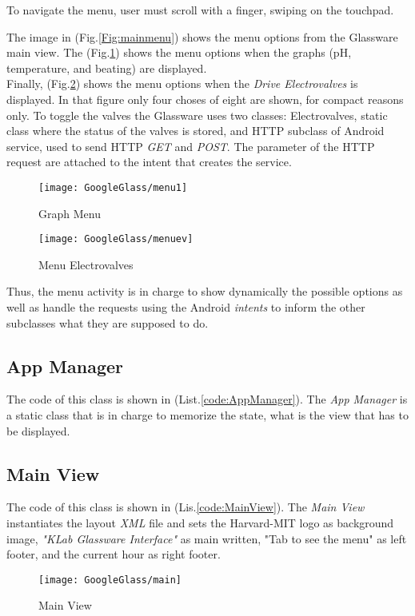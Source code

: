 To navigate the menu, user must scroll with a finger, swiping on the touchpad.

The image in (Fig.\ref{Fig:mainmenu}) shows the menu options from the Glassware main view. The (Fig.\ref{Fig:menu1}) shows the menu options when the graphs (pH, temperature, and beating) are displayed.\\
Finally, (Fig.\ref{Fig:menuev}) shows the menu options when the \textit{Drive Electrovalves} is displayed. In that figure only four choses of eight are shown, for compact reasons only. To toggle the valves the Glassware uses two classes: Electrovalves, static class where the status of the valves is stored, and HTTP subclass of Android service, used to send HTTP \textit{GET} and \textit{POST}. The parameter of the HTTP request are attached to the intent that creates the service.



\begin{figure}[h]
	\centering
	\texttt{[image: GoogleGlass/menu1]}
	\caption{Graph Menu}
	\label{Fig:menu1}
\end{figure}

\begin{figure}[h]
	\centering
	\texttt{[image: GoogleGlass/menuev]}
	\caption{Menu Electrovalves}
	\label{Fig:menuev}
\end{figure}

Thus, the menu activity is in charge to show dynamically the possible options as well as handle the requests using the Android \textit{intents} to inform the other subclasses what they are supposed to do.

\subsection{App Manager}

The code of this class is shown in (List.\ref{code:AppManager}). The \textit{App Manager} is a static class that is in charge to memorize the state, what is the view that has to be displayed.

\subsection{Main View}

The code of this class is shown in (Lis.\ref{code:MainView}). The \textit{Main View} instantiates the layout \textit{XML} file and sets the Harvard-MIT logo as background image, \textit{"KLab Glassware Interface"} as main written, "Tab to see the menu" as left footer, and the current hour as right footer.
\begin{figure}[h]
	\centering
	\texttt{[image: GoogleGlass/main]}
	\caption{Main View}
	\label{Fig:main}
\end{figure}

